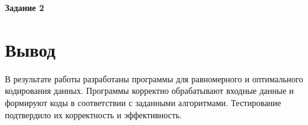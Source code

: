 \documentclass[oneside,a4paper,14pt]{extarticle}
\begin{document}
\noindent\textbf{Задание 2}\\

\newpage
\section*{Вывод}
В результате работы разработаны программы для равномерного и оптимального
кодирования данных. Программы корректно обрабатывают входные данные и формируют
коды в соответствии с заданными алгоритмами. Тестирование подтвердило их
корректность и эффективность.\\
\end{document}
